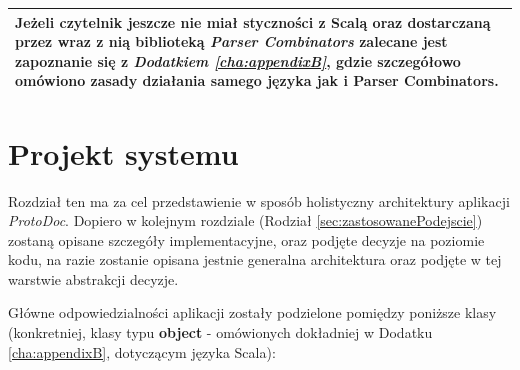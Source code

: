 \documentclass[pdflatex,11pt]{aghdpl}
\begin{document}
\begin{center}
\begin{tabular}{ | p{\textwidth} | }
  \hline 
  Jeżeli czytelnik jeszcze nie miał styczności z Scalą oraz dostarczaną przez wraz z nią biblioteką 
  \textit{Parser Combinators} zalecane jest zapoznanie się z \textit{Dodatkiem \ref{cha:appendixB}}, 
  gdzie szczegółowo omówiono zasady działania samego języka jak i Parser Combinators. \\
  \hline 
\end{tabular}
\end{center}

\chapter{Projekt systemu}
\label{cha:projekt_systemu}

Rozdział ten ma za cel przedstawienie w sposób holistyczny architektury aplikacji \textit{ProtoDoc}.
Dopiero w kolejnym rozdziale (Rodział \ref{sec:zastosowanePodejscie}) zostaną opisane szczegóły implementacyjne, oraz podjęte decyzje na poziomie kodu,
na razie zostanie opisana jestnie generalna architektura oraz podjęte w tej warstwie abstrakcji decyzje.

Główne odpowiedzialności aplikacji zostały podzielone pomiędzy
poniższe klasy (konkretniej, klasy typu \textbf{object} - omówionych dokładniej w Dodatku \ref{cha:appendixB}, dotyczącym języka Scala):
\end{document}
